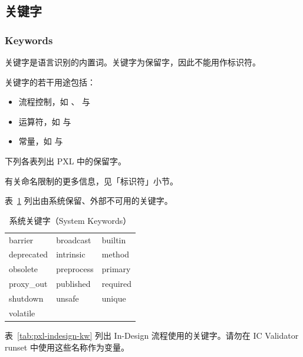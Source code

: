\subsection{关键字}
\subsubsection*{Keywords}
\label{sec:pxl-keywords}

关键字是语言识别的内置词。关键字为保留字，因此不能用作标识符。

关键字的若干用途包括：
\begin{itemize}
  \item 流程控制，如 、 与 
  \item 运算符，如  与 
  \item 常量，如  与 
\end{itemize}

下列各表列出 PXL 中的保留字。

\begin{noteBox}
有关命名限制的更多信息，见「标识符」小节。
\end{noteBox}

表~\ref{tab:pxl-sys-kw} 列出由系统保留、外部不可用的关键字。

\begin{longtable}{@{}>{\raggedright\arraybackslash\ttfamily}p{} >{\raggedright\arraybackslash\ttfamily}p{} >{\raggedright\arraybackslash\ttfamily}p{}@{}}
\caption{系统关键字（System Keywords）}\label{tab:pxl-sys-kw}\\
\toprule
\endfirsthead
\endhead
\bottomrule
\endfoot
barrier & broadcast & builtin \\
deprecated & intrinsic & method \\
obsolete & preprocess & primary \\
proxy\_out & published & required \\
shutdown & unsafe & unique \\
volatile &  &  \\
\end{longtable}

表~\ref{tab:pxl-indesign-kw} 列出 In-Design 流程使用的关键字。请勿在 IC Validator runset 中使用这些名称作为变量。

